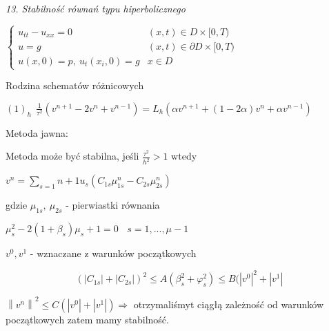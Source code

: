 \textit{13. Stabilność równań typu hiperbolicznego}

$\left\{\begin{matrix} u_{tt} - u_{xx} = 0 & (x,t) \in D \times [0,T) \\ u = g & (x,t) \in \partial D \times [0,T) \\ u(x,0) = p,\ u_t(x_i,0) = g & x \in D \end{matrix}\right.$

Rodzina schematów różnicowych

$(1)_h\ \ \frac{1}{\tau ^2}(v^{n+1} - 2v^n + v^{n-1}) = L_h (\alpha v^{n+1} + (1 - 2\alpha)v^n + \alpha v^{n-1})$

Metoda jawna:

Metoda może być stabilna, jeśli $\frac{\tau ^2}{h^2} > 1$ wtedy

$v^n = \sum_{s=1}{n+1} u_s(C_{1s} \mu_{1s}^n - C_{2s} \mu_{2s}^n)$

gdzie $\mu_{1s},\ \mu_{2s}$ - pierwiastki równania

$\mu_s^2 - 2(1+ \beta _s)\mu_s + 1 = 0\ \ \ \ s = 1, ..., \mu -1$

$v^0,v^1$ - wznaczane z warunków początkowych

\[ (\left | C_{1s} \right | + \left | C_{2s} \right |)^2 \leqslant A(\beta_s^2 + \varphi_s^2) \leqslant B(\left | v^0 \right |^2 + \left | v^1 \right | \]

$\left \| v^n \right \|^2 \leqslant C(\left | v^0 \right | + \left | v^1 \right |) \Rightarrow$ otrzymaliśmyt ciągłą zależność od warunków początkowych zatem mamy stabilność.